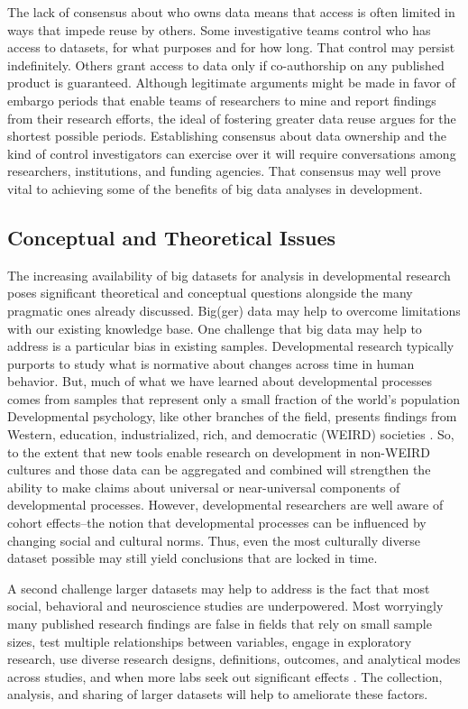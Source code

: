 \documentclass[letterpaper,man,apacite,natbib]{apa6}
\begin{document}
The lack of consensus about who owns data means that access is often limited in ways that impede reuse by others.
Some investigative teams control who has access to datasets, for what purposes and for how long.
That control may persist indefinitely.
Others grant access to data only if co-authorship on any published product is guaranteed.
Although legitimate arguments might be made in favor of embargo periods that enable teams of researchers to mine and report findings from their research efforts, the ideal of fostering greater data reuse argues for the shortest possible periods.
Establishing consensus about data ownership and the kind of control investigators can exercise over it will require conversations among researchers, institutions, and funding agencies.
That consensus may well prove vital to achieving some of the benefits of big data analyses in development. 

\subsection{Conceptual and Theoretical Issues}

The increasing availability of big datasets for analysis in developmental research poses significant theoretical and conceptual questions alongside the many pragmatic ones already discussed.
Big(ger) data may help to overcome limitations with our existing knowledge base.
One challenge that big data may help to address is a particular bias in existing samples.
Developmental research typically purports to study what is normative about changes across time in human behavior.
But, much of what we have learned about developmental processes comes from samples that represent only a small fraction of the world's population \cite{karasik2010weird, fernald2010getting}
Developmental psychology, like other branches of the field, presents findings from Western, education, industrialized, rich, and democratic (WEIRD) societies \cite{henrich_weirdest_2010}.
So, to the extent that new tools enable research on development in non-WEIRD cultures and those data can be aggregated and combined will strengthen the ability to make claims about universal or near-universal components of developmental processes.
However, developmental researchers are well aware of cohort effects--the notion that developmental processes can be influenced by changing social and cultural norms.
Thus, even the most culturally diverse dataset possible may still yield conclusions that are locked in time.

A second challenge larger datasets may help to address is the fact that most social, behavioral \cite{maxwell_persistence_2004} and neuroscience studies \cite{button_power_2013} are underpowered.
Most worryingly many published research findings are false in fields that rely on small sample sizes, test multiple relationships between variables, engage in exploratory research, use diverse research designs, definitions, outcomes, and analytical modes across studies, and when more labs seek out significant effects \cite{ioannidis_why_2005}.
The collection, analysis, and sharing of larger datasets will help to ameliorate these factors.
\end{document}
